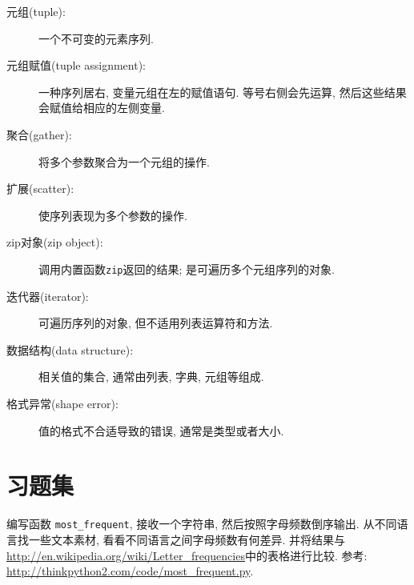 \documentclass[10pt]{book}
\begin{document}
\begin{description}

\item[元组(tuple):] 一个不可变的元素序列. 

\item[元组赋值(tuple assignment):] 一种序列居右, 变量元组在左的赋值语句. 
等号右侧会先运算, 然后这些结果会赋值给相应的左侧变量. 

\item[聚合(gather):] 将多个参数聚合为一个元组的操作.

\item[扩展(scatter):] 使序列表现为多个参数的操作. 

\item[zip对象(zip object):] 调用内置函数{\tt zip}返回的结果;
是可遍历多个元组序列的对象. 

\item[迭代器(iterator):] 可遍历序列的对象, 但不适用列表运算符和方法. 

\item[数据结构(data structure):] 相关值的集合, 通常由列表, 字典, 元组等组成. 

\item[格式异常(shape error):] 值的格式不合适导致的错误, 通常是类型或者大小. 

\end{description}


\section{习题集}

\begin{exercise}

编写函数 \verb"most_frequent", 接收一个字符串, 然后按照字母频数倒序输出. 
从不同语言找一些文本素材, 看看不同语言之间字母频数有何差异. 
并将结果与\url{http://en.wikipedia.org/wiki/Letter_frequencies}中的表格进行比较. 
参考:
\url{http://thinkpython2.com/code/most_frequent.py}.  

\end{exercise}
\end{document}
